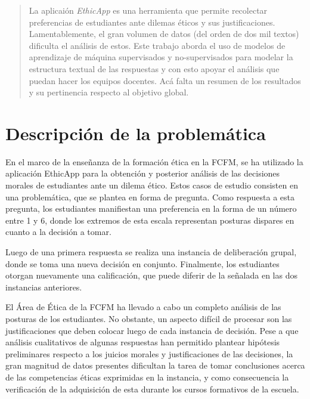 \documentclass[
	spanish, %
	letterpaper, oneside
]{article}
\begin{document}
	
\templatePagecfg


\templateFinalcfg


\inserttitle

\begin{abstract}
    La aplicaión \textit{EthicApp} es una herramienta que permite recolectar preferencias de estudiantes ante dilemas éticos y sus justificaciones. Lamentablemente, el gran volumen de datos (del orden de dos mil textos) dificulta el análisis de estos. Este trabajo aborda el uso de modelos de aprendizaje de máquina supervisados y no-supervisados para modelar la estructura textual de las respuestas y con esto apoyar el análisis que puedan hacer los equipos docentes. \color{red} Acá falta un resumen de los resultados y su pertinencia respecto al objetivo global. \color{black}
\end{abstract}


\section{Descripción de la problemática}

En el marco de la enseñanza de la formación ética en la FCFM, se ha utilizado la aplicación EthicApp para la obtención y posterior análisis de las decisiones morales de estudiantes ante un dilema ético. Estos casos de estudio consisten en una problemática, que se plantea en forma de pregunta. Como respuesta a esta pregunta, los estudiantes manifiestan una preferencia en la forma de un número entre 1 y 6, donde los extremos de esta escala representan posturas dispares en cuanto a la decisión a tomar.


Luego de una primera respuesta se realiza una instancia de deliberación grupal, donde se toma una nueva decisión en conjunto. Finalmente, los estudiantes otorgan nuevamente una calificación, que puede diferir de la señalada en las dos instancias anteriores.


\newp El Área de Ética de la FCFM ha llevado a cabo un completo análisis de las posturas de los estudiantes. No obstante, un aspecto difícil de procesar son las justificaciones que deben colocar luego de cada instancia de decisión. Pese a que análisis cualitativos de algunas respuestas han permitido plantear hipótesis preliminares respecto a los juicios morales y justificaciones de las decisiones, la gran magnitud de datos presentes dificultan la tarea de tomar conclusiones acerca de las competencias éticas exprimidas en la instancia, y como consecuencia la verificación de la adquisición de esta durante los cursos formativos de la escuela.
\end{document}
